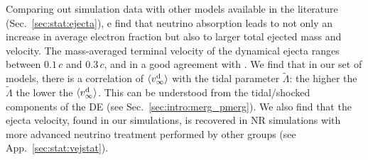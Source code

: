 %
Comparing out simulation data with other models available in the literature 
(Sec.~\ref{sec:stat:ejecta}), e find that neutrino absorption leads to not only 
an increase in average electron fraction but also to larger total ejected mass 
and velocity. 
The mass-averaged terminal velocity of the dynamical ejecta 
ranges between $0.1\,c$ and $0.3\,c$, and in a good agreement with 
\citep{Radice:2018pdn}.
%
We find that in our set of models, there is a correlation of $\langle v^{\text{d}}_\infty\rangle$ with the 
tidal parameter $\tilde{\Lambda}$: the higher the $\tilde{\Lambda}$ the lower 
the $\langle v^{\text{d}}_\infty\rangle$. This can be understood from the tidal/shocked components of the 
\ac{DE} (see Sec.~\ref{sec:intro:merg_pmerg}).
%
We also find that the ejecta velocity, found in our simulations, 
is recovered in \ac{NR} simulations with more advanced neutrino 
treatment performed by other groups (see App.~\ref{sec:stat:vejstat}).
%
%
